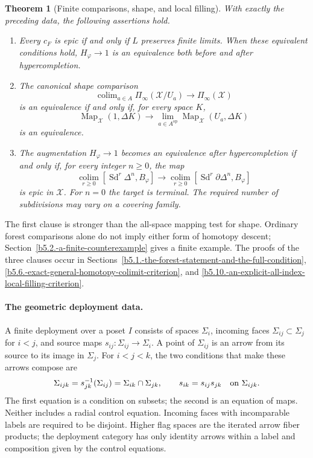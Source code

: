 \documentclass[11pt,a4paper]{article}
\newtheorem{theorem}{Theorem}[section]
\theoremstyle{definition}
\newcommand{\Map}{\operatorname{Map}}
\begin{document}
\begin{theorem}[Finite comparisons, shape, and local filling]
\label{thm:higher-comparisons}
With exactly the preceding data, the following assertions hold.
\begin{enumerate}
\item Every $c_F$ is epic if and only if $L$ preserves finite limits.
When these equivalent conditions hold, $H_\varphi\to1$ is an equivalence
both before and after hypercompletion.
\item The canonical shape comparison
\[
 \operatorname{colim}_{a\in A}\Pi_\infty(\mathscr X/U_a)
 \longrightarrow\Pi_\infty(\mathscr X)                         \tag{HS1}
\]
is an equivalence if and only if, for every space $K$,
\[
 \Map_{\mathscr X}(1,\Delta K)\longrightarrow
 \lim_{a\in A^{\mathrm{op}}}\Map_{\mathscr X}(U_a,\Delta K)       \tag{HS2}
\]
is an equivalence.
\item The augmentation $H_\varphi\to1$ becomes an equivalence after
hypercompletion if and only if, for every integer $n\ge0$, the map
\[
 \operatorname*{colim}_{r\ge0}
 [\operatorname{Sd}^{r}\Delta^n,B_\varphi]\longrightarrow
 \operatorname*{colim}_{r\ge0}
 [\operatorname{Sd}^{r}\partial\Delta^n,B_\varphi]               \tag{HF}
\]
is epic in $\mathcal X$. For $n=0$ the target is terminal.
The required number of subdivisions may vary on a covering family.
\end{enumerate}
\end{theorem}
The first clause is stronger than the all-space mapping test for shape.
Ordinary forest comparisons alone do not imply either form of homotopy
descent; Section~\ref{b5.2.-a-finite-counterexample} gives a finite example.
The proofs of the three clauses occur in
Sections~\ref{b5.1.-the-forest-statement-and-the-full-condition},
\ref{b5.6.-exact-general-homotopy-colimit-criterion}, and
\ref{b5.10.-an-explicit-all-index-local-filling-criterion}.

\paragraph{The geometric deployment data.}
A finite deployment over a poset $I$ consists of spaces $\Sigma_i$,
incoming faces $\Sigma_{ij}\subset\Sigma_j$ for $i<j$, and source maps
$s_{ij}:\Sigma_{ij}\to\Sigma_i$. A point of $\Sigma_{ij}$ is an arrow
from its source to its image in $\Sigma_j$. For $i<j<k$, the two
conditions that make these arrows compose are
\begin{equation}\label{eq:control}
 \Sigma_{ijk}=s_{jk}^{-1}(\Sigma_{ij})
       =\Sigma_{ik}\cap\Sigma_{jk},\qquad
 s_{ik}=s_{ij}s_{jk}\quad\hbox{on }\Sigma_{ijk}.
\end{equation}
The first equation is a condition on subsets; the second is an equation
of maps. Neither includes a radial control equation. Incoming faces
with incomparable labels are required to be disjoint. Higher flag spaces are the iterated arrow fiber products; the deployment category has only identity arrows within a label and composition given by the control equations.
\end{document}
